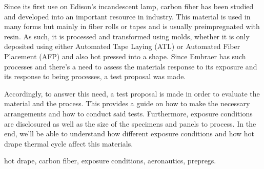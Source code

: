 Since its first use on Edison's incandescent lamp, carbon fiber has been studied and developed into an important resource in industry. This material is used in many forms but mainly in fiber rolls or tapes and is usually preimpregnated with resin. As such, it is processed and transformed using molds, whether it is only deposited using either Automated Tape Laying (ATL) or Automated Fiber Placement (AFP) and also hot pressed into a shape. Since Embraer has such processes and there's a need to assess the materials response to its exposure and its response to being processes, a test proposal was made.

Accordingly, to answer this need, a test proposal is made in order to evaluate the material and the process. This provides a guide on how to make the necessary arrangements and how to conduct said tests. Furthermore, exposure conditions are disclosured as well as the size of the specimens and panels to process. In the end, we'll be able to understand how different exposure conditions and how hot drape thermal cycle affect this materials.

\begin{keywords}
hot drape, carbon fiber, exposure conditions, aeronautics, prepregs.
\end{keywords} 
